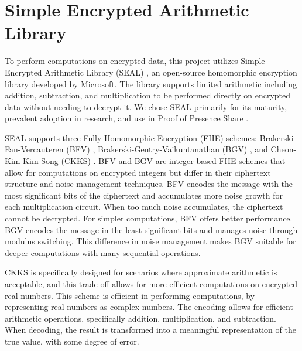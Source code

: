\section{Simple Encrypted Arithmetic Library}
\label{sec:Background SEAL}
To perform computations on encrypted data, this project utilizes Simple Encrypted Arithmetic Library (SEAL) \cite{sealcrypto}, an open-source homomorphic encryption library developed by Microsoft. The library supports limited arithmetic including addition, subtraction, and multiplication to be performed directly on encrypted data without needing to decrypt it. We chose SEAL primarily for its maturity, prevalent adoption in research, and use in Proof of Presence Share \cite{Lagesse2021-PopShare}.

SEAL supports three Fully Homomorphic Encryption (FHE) schemes: Brakerski-Fan-Vercauteren (BFV) \cite{fan2012-bfv}, Brakerski-Gentry-Vaikuntanathan (BGV) \cite{brakerski2012-bgv}, and Cheon-Kim-Kim-Song (CKKS) \cite{Cheon2017-CKKS}. BFV and BGV are integer-based FHE schemes that allow for computations on encrypted integers but differ in their ciphertext structure and noise management techniques. BFV encodes the message with the most significant bits of the ciphertext and accumulates more noise growth for each multiplication circuit. When too much noise accumulates, the ciphertext cannot be decrypted. For simpler computations, BFV offers better performance. BGV encodes the message in the least significant bits and manages noise through modulus switching. This difference in noise management makes BGV suitable for deeper computations with many sequential operations. 

CKKS is specifically designed for scenarios where approximate arithmetic is acceptable, and this trade-off allows for more efficient computations on encrypted real numbers. This scheme is efficient in performing computations, by representing real numbers as complex numbers. The encoding allows for efficient arithmetic operations, specifically addition, multiplication, and subtraction. When decoding, the result is transformed into a meaningful representation of the true value, with some degree of error. 
